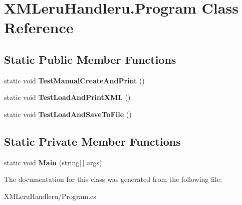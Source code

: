 \hypertarget{class_x_m_leru_handleru_1_1_program}{}\section{X\+M\+Leru\+Handleru.\+Program Class Reference}
\label{class_x_m_leru_handleru_1_1_program}
\subsection*{Static Public Member Functions}
\begin{DoxyCompactItemize}
\item 
\hypertarget{class_x_m_leru_handleru_1_1_program_a1fac06cc0ab95a39af3c262ae2152739}{}static void {\bfseries Test\+Manual\+Create\+And\+Print} ()\label{class_x_m_leru_handleru_1_1_program_a1fac06cc0ab95a39af3c262ae2152739}

\item 
\hypertarget{class_x_m_leru_handleru_1_1_program_a46277b5cc2e1f90abc6072dbf7b3bd28}{}static void {\bfseries Test\+Load\+And\+Print\+X\+M\+L} ()\label{class_x_m_leru_handleru_1_1_program_a46277b5cc2e1f90abc6072dbf7b3bd28}

\item 
\hypertarget{class_x_m_leru_handleru_1_1_program_a928ffe04f368b42de64fd208a2b2548d}{}static void {\bfseries Test\+Load\+And\+Save\+To\+File} ()\label{class_x_m_leru_handleru_1_1_program_a928ffe04f368b42de64fd208a2b2548d}

\end{DoxyCompactItemize}
\subsection*{Static Private Member Functions}
\begin{DoxyCompactItemize}
\item 
\hypertarget{class_x_m_leru_handleru_1_1_program_a6d7fc302b636f572052e0fe0b63307d6}{}static void {\bfseries Main} (string\mbox{[}$\,$\mbox{]} args)\label{class_x_m_leru_handleru_1_1_program_a6d7fc302b636f572052e0fe0b63307d6}

\end{DoxyCompactItemize}


The documentation for this class was generated from the following file\+:\begin{DoxyCompactItemize}
\item 
X\+M\+Leru\+Handleru/Program.\+cs\end{DoxyCompactItemize}
